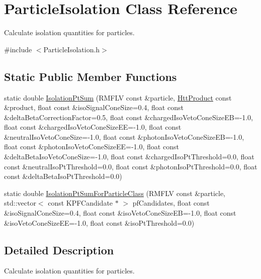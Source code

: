 \hypertarget{classParticleIsolation}{
\section{ParticleIsolation Class Reference}
\label{classParticleIsolation}
}


Calculate isolation quantities for particles.  


{\ttfamily \#include $<$ParticleIsolation.h$>$}\subsection*{Static Public Member Functions}
\begin{DoxyCompactItemize}
\item 
static double \hyperlink{classParticleIsolation_a4b20bab9ea810932c7373be4cea97fe7}{IsolationPtSum} (RMFLV const \&particle, \hyperlink{classHttProduct}{HttProduct} const \&product, float const \&isoSignalConeSize=0.4, float const \&deltaBetaCorrectionFactor=0.5, float const \&chargedIsoVetoConeSizeEB=-\/1.0, float const \&chargedIsoVetoConeSizeEE=-\/1.0, float const \&neutralIsoVetoConeSize=-\/1.0, float const \&photonIsoVetoConeSizeEB=-\/1.0, float const \&photonIsoVetoConeSizeEE=-\/1.0, float const \&deltaBetaIsoVetoConeSize=-\/1.0, float const \&chargedIsoPtThreshold=0.0, float const \&neutralIsoPtThreshold=0.0, float const \&photonIsoPtThreshold=0.0, float const \&deltaBetaIsoPtThreshold=0.0)
\item 
static double \hyperlink{classParticleIsolation_a7f985068c1510e793431217e73f1d4b2}{IsolationPtSumForParticleClass} (RMFLV const \&particle, std::vector$<$ const KPFCandidate $\ast$ $>$ pfCandidates, float const \&isoSignalConeSize=0.4, float const \&isoVetoConeSizeEB=-\/1.0, float const \&isoVetoConeSizeEE=-\/1.0, float const \&isoPtThreshold=0.0)
\end{DoxyCompactItemize}


\subsection{Detailed Description}
Calculate isolation quantities for particles. 

